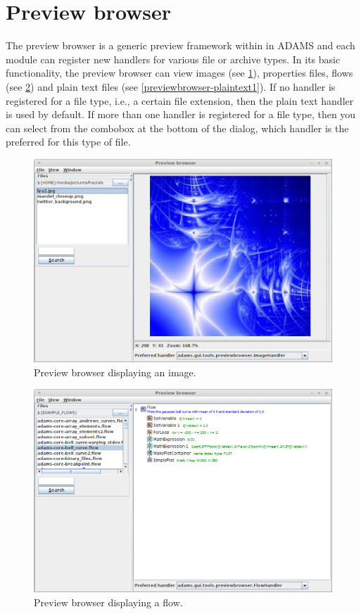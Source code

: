 \section{Preview browser}
The preview browser is a generic preview framework within in ADAMS and each
module can register new handlers for various file or archive types. In its basic
functionality, the preview browser can view images (see
\ref{previewbrowser-image1}), properties files, flows (see
\ref{previewbrowser-flow1}) and plain text files (see
\ref{previewbrowser-plaintext1}). If no handler is registered for a file type,
i.e., a certain file extension, then the plain text handler is used by default.
If more than one handler is registered for a file type, then you can select
from the combobox at the bottom of the dialog, which handler is the preferred
for this type of file.

\begin{figure}[htb]
  \centering
  \includegraphics[width=12.0cm]{images/previewbrowser-image1.png}
  \caption{Preview browser displaying an image.}
  \label{previewbrowser-image1}
\end{figure}

\begin{figure}[htb]
  \centering
  \includegraphics[width=12.0cm]{images/previewbrowser-flow1.png}
  \caption{Preview browser displaying a flow.}
  \label{previewbrowser-flow1}
\end{figure}

